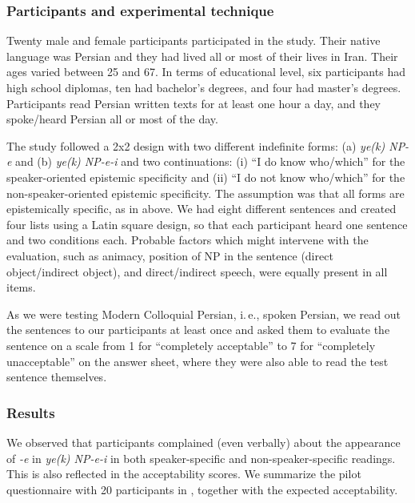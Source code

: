 \documentclass[output=paper]{langsci/langscibook}
\begin{document}
\subsubsection{Participants and experimental technique}\label{4sec:511}

Twenty male and female participants participated in the study. Their native language was Persian and they had lived all or most of their lives in Iran. Their ages varied between 25 and 67. In terms of educational level, six participants had high school diplomas, ten had bachelor's degrees, and four had master's degrees. Participants read Persian written texts for at least one hour a day, and they spoke/heard Persian all or most of the day.

{
The study followed a 2x2 design with two different indefinite forms: (a) {\emph{ye(k) NP-e}} and (b) {\emph{ye(k) NP-e-i}} and two continuations: (i) ``I do know who/which'' for the speaker-oriented epistemic specificity and (ii) ``I do not know who/which'' for the non-speaker-oriented epistemic specificity. The assumption was that all forms are epistemically specific, as in  above. We had eight different sentences and created four lists using a Latin square design, so that each participant heard one sentence and two conditions each. Probable factors which might intervene with the evaluation, such as animacy, position of NP in the sentence (direct object/indirect object), and direct/indirect speech, were equally present in all items.
}

As we were testing Modern Colloquial Persian, i.\,e., spoken Persian, we read out the sentences to our participants at least once and asked them to evaluate the sentence on a scale from 1 for ``completely acceptable'' to 7 for ``completely unacceptable'' on the answer sheet, where they were also able to read the test sentence themselves.


\subsubsection{Results}\label{4sec:512}

We observed that participants complained (even verbally) about the appearance of {\emph{-e}} in {\emph{ye(k) NP-e-i}} in both speaker-specific and non-speaker-specific readings. This is also reflected in the acceptability scores. We summarize the pilot questionnaire with 20 participants in , together with the expected acceptability.
\end{document}
